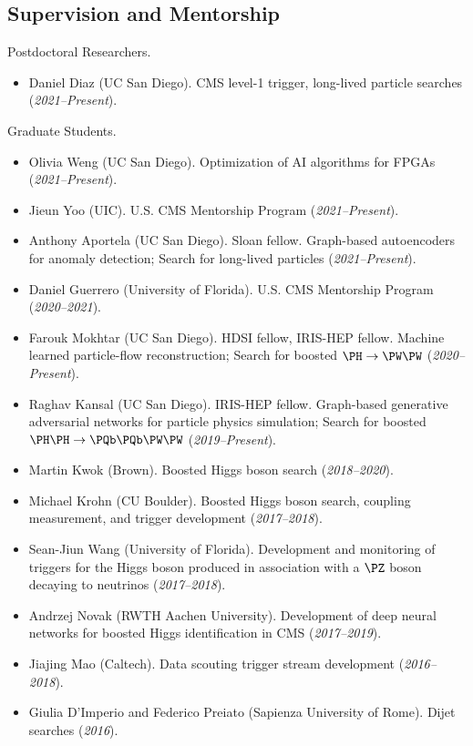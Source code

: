 \documentclass[11pt]{res}
\newcommand{\MarginText}[1]{\section{#1}\vspace{10pt}}
\begin{document}
\begin{resume}

  \MarginText{Supervision and Mentorship}

  Postdoctoral Researchers.
  \begin{itemize}
    \itemsep-0.3em
    \item Daniel Diaz (UC San Diego). CMS level-1 trigger, long-lived particle searches (\textit{2021--Present}).
  \end{itemize}

  Graduate Students.
  \begin{itemize}
    \itemsep-0.3em
    \item Olivia Weng (UC San Diego). Optimization of AI algorithms for FPGAs (\textit{2021--Present}).
    \item Jieun Yoo (UIC). U.S. CMS Mentorship Program (\textit{2021--Present}).
    \item Anthony Aportela (UC San Diego). Sloan fellow. Graph-based autoencoders for anomaly detection; Search for long-lived particles (\textit{2021--Present}).
    \item Daniel Guerrero (University of Florida). U.S. CMS Mentorship Program (\textit{2020--2021}).
    \item Farouk Mokhtar (UC San Diego). HDSI fellow, IRIS-HEP fellow. Machine learned particle-flow reconstruction; Search for boosted $\PH\to\PW\PW$ (\textit{2020--Present}).
    \item Raghav Kansal (UC San Diego). IRIS-HEP fellow. Graph-based generative adversarial networks for particle physics simulation; Search for boosted $\PH\PH\to\PQb\PQb\PW\PW$ (\textit{2019--Present}).
    \item Martin Kwok (Brown). Boosted Higgs boson search (\textit{2018--2020}).
    \item Michael Krohn (CU Boulder). Boosted Higgs boson search, coupling measurement, and trigger development (\textit{2017--2018}).
    \item Sean-Jiun Wang (University of Florida). Development and monitoring of triggers for the Higgs boson produced in association with a $\PZ$ boson decaying to neutrinos (\textit{2017--2018}).
    \item Andrzej Novak (RWTH Aachen University). Development of deep neural networks for boosted Higgs identification in CMS (\textit{2017--2019}).
    \item Jiajing Mao (Caltech). Data scouting trigger stream development (\textit{2016--2018}).
    \item Giulia D'Imperio and Federico Preiato (Sapienza University of Rome). Dijet searches (\textit{2016}).
  \end{itemize}


\end{resume}
\end{document}
